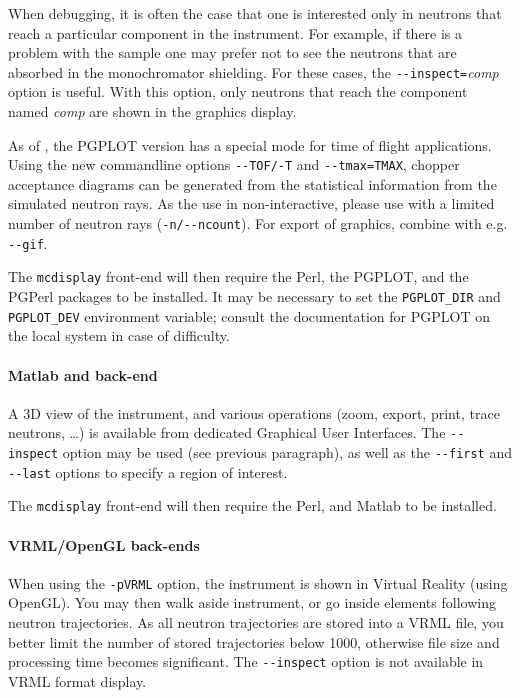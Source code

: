When debugging, it is often the case that one is interested only in neutrons
that reach a particular component in the instrument. For example, if there is a
problem with the sample one may prefer not to see the neutrons that are absorbed
in the monochromator shielding. For these cases, the
\verb+--inspect=+\textit{comp\/} option is useful. With this option, only
neutrons that reach the component named \textit{comp\/} are shown in the
graphics display.

As of , the PGPLOT version has a special mode for time of flight
applications. Using the new commandline options \verb+--TOF/-T+ and
\verb+--tmax=TMAX+, chopper acceptance diagrams can be generated from the
statistical information from the simulated neutron rays. As the use in
non-interactive, please use with a limited number of neutron rays
(\verb+-n/--ncount+). For export of graphics, combine with e.g. \verb+--gif+.

 The \verb+mcdisplay+ front-end will then require the Perl,
the PGPLOT, and the PGPerl packages to be installed. It may be necessary to set
the \verb+PGPLOT_DIR+ and \verb+PGPLOT_DEV+ environment variable; consult the
documentation for PGPLOT on the local system in case of difficulty.
  

\paragraph{Matlab and back-end}

A 3D view of the instrument, and various operations (zoom, export, print, trace
neutrons, \ldots) is available from dedicated Graphical User Interfaces.  The
\verb+--inspect+ option may be used (see previous paragraph), as well as the
\verb+--first+ and \verb+--last+ options to specify a region of interest.

The \verb+mcdisplay+ front-end will then require the Perl, and
Matlab to be installed. 

\paragraph{VRML/OpenGL back-ends}

When using the \verb+-pVRML+ option, the instrument is shown in Virtual Reality
(using OpenGL). You may then walk aside instrument, or go inside elements
following neutron trajectories. As all neutron trajectories are stored into a
VRML file, you better limit the number of stored trajectories below 1000,
otherwise file size and processing time becomes significant. The
\verb+--inspect+ option is not available in VRML format display.


